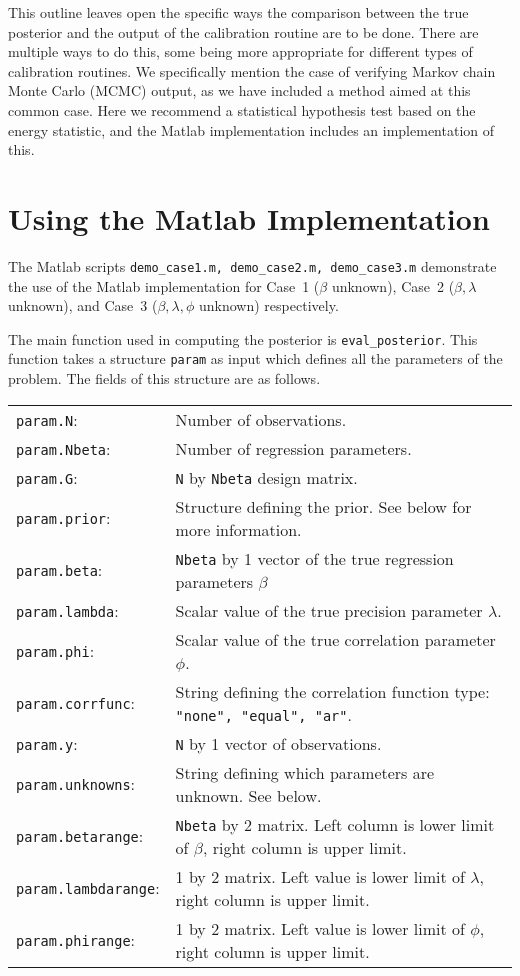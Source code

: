 \documentclass{book}
\begin{document}
This outline leaves open the specific ways the comparison between the true posterior and the output of the calibration
routine are to be done. There are multiple ways to do this, some being more appropriate for different types of calibration
routines. We specifically mention the case of verifying Markov chain Monte Carlo (MCMC) output, as we have included 
a method aimed at this common case. Here we recommend a statistical hypothesis test based on the energy statistic, and 
the Matlab implementation includes an implementation of this.

\chapter{Using the Matlab Implementation}
The Matlab scripts {\tt demo\_case1.m, demo\_case2.m, demo\_case3.m} demonstrate the use of the Matlab implementation
for Case~1 ($\beta$ unknown), Case~2 ($\beta, \lambda$ unknown), and Case~3 ($\beta, \lambda, \phi$ unknown) respectively.

The main function used in computing the posterior is {\tt eval\_posterior}. This function takes a structure {\tt param} as input
which defines all the parameters of the problem. The fields of this structure are as follows.

\vspace{.1in}
\begin{tabular}{l l}
{\tt param.N}: & Number of observations. \\
{\tt param.Nbeta}: & Number of regression parameters. \\
{\tt param.G}:  & {\tt N} by {\tt Nbeta} design matrix. \\
{\tt param.prior}: & Structure defining the prior. See below for more information. \\
{\tt param.beta}: & {\tt Nbeta} by 1 vector of the true regression parameters $\beta$ \\
{\tt param.lambda}: & Scalar value of the true precision parameter $\lambda$. \\
{\tt param.phi}: & Scalar value of the true correlation parameter $\phi$. \\  
{\tt param.corrfunc}: & String defining the correlation function type: {\tt "none", "equal", "ar"}. \\
{\tt param.y}: & {\tt N} by 1 vector of observations. \\
{\tt param.unknowns}: & String defining which parameters are unknown. See below. \\
{\tt param.betarange}: & {\tt Nbeta} by 2 matrix. Left column is lower limit of $\beta$, right column is upper limit. \\
{\tt param.lambdarange}: & 1 by 2 matrix. Left value is lower limit of $\lambda$, right column is upper limit. \\
{\tt param.phirange}: & 1 by 2 matrix. Left value is lower limit of $\phi$, right column is upper limit. \\
\end{tabular}
\end{document}
